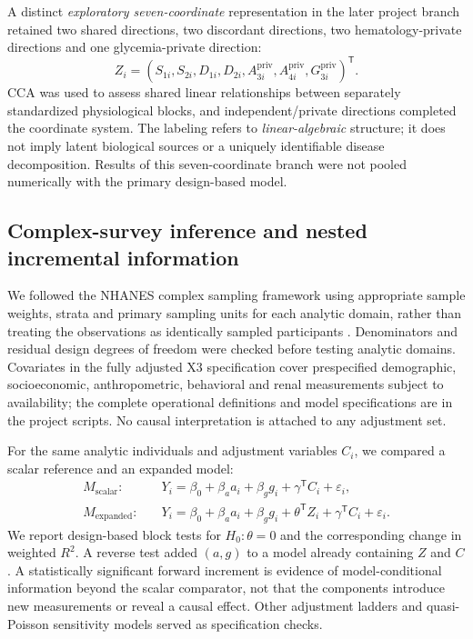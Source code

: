 \documentclass[11pt,a4paper]{article}
\newcommand{\Rtwo}{R^{2}}
\begin{document}
A distinct \emph{exploratory seven-coordinate} representation in the later project branch retained two shared directions, two discordant directions, two hematology-private directions and one glycemia-private direction:
\begin{equation}
Z_i=(S_{1i},S_{2i},D_{1i},D_{2i},A_{3i}^{\mathrm{priv}},A_{4i}^{\mathrm{priv}},G_{3i}^{\mathrm{priv}})^{\mathsf T}.
\label{eq:zseven}
\end{equation}
CCA was used to assess shared linear relationships between separately standardized physiological blocks, and independent/private directions completed the coordinate system. The labeling refers to \emph{linear-algebraic} structure; it does not imply latent biological sources or a uniquely identifiable disease decomposition. Results of this seven-coordinate branch were not pooled numerically with the primary design-based model.

\subsection{Complex-survey inference and nested incremental information}
We followed the NHANES complex sampling framework using appropriate sample weights, strata and primary sampling units for each analytic domain, rather than treating the observations as identically sampled participants \cite{nhanesportal,nhanes2123}. Denominators and residual design degrees of freedom were checked before testing analytic domains. Covariates in the fully adjusted X3 specification cover prespecified demographic, socioeconomic, anthropometric, behavioral and renal measurements subject to availability; the complete operational definitions and model specifications are in the project scripts. No causal interpretation is attached to any adjustment set.

For the same analytic individuals and adjustment variables $C_i$, we compared a scalar reference and an expanded model:
\begin{align}
M_{\mathrm{scalar}}:\quad &Y_i=\beta_0+\beta_a a_i+\beta_g g_i+\gamma^{\mathsf T}C_i+\varepsilon_i,\\
M_{\mathrm{expanded}}:\quad &Y_i=\beta_0+\beta_a a_i+\beta_g g_i+\theta^{\mathsf T}Z_i+\gamma^{\mathsf T}C_i+\varepsilon_i.
\end{align}
We report design-based block tests for $H_0:\theta=0$ and the corresponding change in weighted $\Rtwo$. A reverse test added $(a,g)$ to a model already containing $Z$ and $C$. A statistically significant forward increment is evidence of model-conditional information beyond the scalar comparator, not that the components introduce new measurements or reveal a causal effect. Other adjustment ladders and quasi-Poisson sensitivity models served as specification checks.
\end{document}
